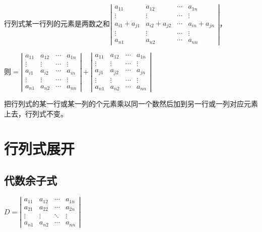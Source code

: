 \documentclass[UTF8, 12pt]{ctexart}
\begin{document}
行列式某一行列的元素是两数之和$
\left|\begin{array}{cccc} 
    a_{11} & a_{12} & \cdots & a_{1n} \\
    \vdots & \vdots & \cdots & \vdots \\
    a_{i1}+a_{j1} & a_{i2}+a_{j2} & \cdots & a_{in}+a_{jn} \\
    \vdots & \vdots & \cdots & \vdots \\
    a_{n1} & a_{n2} & \cdots & a_{nn}
\end{array}\right| 
$，

则$=\left|\begin{array}{cccc} 
    a_{11} & a_{12} & \cdots & a_{1n} \\
    \vdots & \vdots & \cdots & \vdots \\
    a_{i1} & a_{i2} & \cdots & a_{in}\\
    \vdots & \vdots & \cdots & \vdots \\
    a_{n1} & a_{n2} & \cdots & a_{nn}
\end{array}\right|+
\left|\begin{array}{cccc} 
    a_{11} & a_{12} & \cdots & a_{1n} \\
    \vdots & \vdots & \cdots & \vdots \\
    a_{j1} & a_{j2} & \cdots & a_{jn} \\
    \vdots & \vdots & \cdots & \vdots \\
    a_{n1} & a_{n2} & \cdots & a_{nn}
\end{array}\right|$

把行列式的某一行或某一列的个元素乘以同一个数然后加到另一行或一列对应元素上去，行列式不变。

\section{行列式展开}

\subsection{代数余子式}

$
D=\left|\begin{array}{cccc} 
    a_{11} & a_{12} & \cdots & a_{1n} \\
    a_{21} & a_{22} & \cdots & a_{2n} \\
    \vdots & \vdots & \ddots & \vdots \\
    a_{n1} & a_{n2} & \cdots & a_{nn}
\end{array}\right|
$
\end{document}
